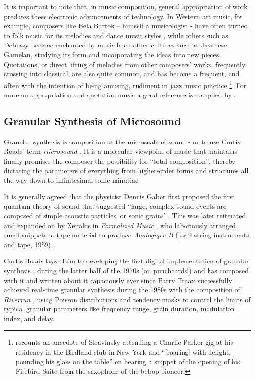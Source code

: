 It is important to note that, in music composition, general appropriation of work predates these electronic advancements of technology. In Western art music, for example, composers like Bela Bartók – himself a musicologist - have often turned to folk music for its melodies and dance music styles \citep{Bartok1993}, while others such as Debussy \citep{Tamagawa1988} became enchanted by music from other cultures such as Javanese Gamelan, studying its form and incorporating the ideas into new pieces. Quotations, or direct lifting of melodies from other composers’ works, frequently crossing into classical, are also quite common, and has become a frequent, and often with the intention of being amusing, rudiment in jazz music practice \citep{Mangani2006}\footnote{\cite{Appel2002} recounts an anecdote of Stravinsky attending a Charlie Parker gig at his residency in the Birdland club in New York and ``[roaring] with delight, pounding his glass on the table'' on hearing a snippet of the opening of his Firebird Suite from the saxophone of the bebop pioneer.}.  For more on appropriation and quotation music a good reference is compiled by \cite{Metzer2003}.

\subsection{Granular Synthesis of Microsound}

Granular synthesis is composition at the microscale of sound - or to use Curtis Roads' term \textit{microsound} \citep{Roads2004}. It is a molecular viewpoint of music that \cite{Thomson2004} maintains finally promises the composer the possibility for ``total composition'', thereby dictating the parameters of everything from higher-order forms and structures all the way down to infinitesimal sonic minutiae.

It is generally agreed that the physicist Dennis Gabor first proposed the first quantum theory of sound that suggested ``large, complex sound events are composed of simple acoustic particles, or sonic grains' \citep{Miranda1995}. This was later reiterated and expanded on by Xenakis in \textit{Formalized Music} \citep{Bradshaw1973}, who laboriously arranged small snippets of tape material to produce \textit{Analogique B} (for 9 string instruments and tape, 1959) \citep{Robindore2009}.

Curtis Roads lays claim to developing the first digital implementation of granular synthesis \citep{Roads1998}, during the latter half of the 1970s (on punchcards!) and has composed with it and written about it capaciously ever since \citep{Roads1985, Roads1991, Roads1996, Roads2004} Barry Truax successfully achieved real-time granular synthesis during the 1980s with the composition of \textit{Riverrun} \citep{Truax1998}, using Poisson distributions and tendency masks to control the limits of typical granular parameters like frequency range, grain duration, modulation index, and delay.

